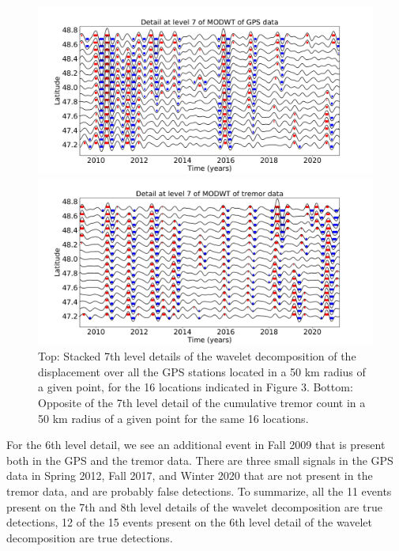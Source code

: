 \documentclass[draft]{agujournal2018}
\begin{document}
\begin{figure}
\noindent\includegraphics[width=\textwidth, trim={0cm 0cm 0cm 0cm},clip]{figures/GPS_detail_7.pdf}

\noindent\includegraphics[width=\textwidth, trim={0cm 0cm 0cm 0cm},clip]{figures/tremor_detail_7.pdf}
\caption{Top: Stacked 7th level details of the wavelet decomposition of the displacement over all the GPS stations located in a 50 km radius of a given point, for the 16 locations indicated in Figure 3. Bottom: Opposite of the 7th level detail of the cumulative tremor count in a 50 km radius of a given point for the same 16 locations.}
\label{pngfiguresample}
\end{figure}

For the 6th level detail, we see an additional event in Fall 2009 that is present both in the GPS and the tremor data. There are three small signals in the GPS data in Spring 2012, Fall 2017, and Winter 2020 that are not present in the tremor data, and are probably false detections. To summarize, all the 11 events present on the 7th and 8th level details of the wavelet decomposition are true detections, 12 of the 15 events present on the 6th level detail of the wavelet decomposition are true detections. \\
\end{document}
